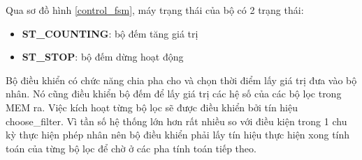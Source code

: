 Qua sơ đồ hình \ref{control_fsm}, máy trạng thái của bộ có 2 trạng thái:
\begin{itemize}
    \item \textbf{ST\_COUNTING}: bộ đếm tăng giá trị
    \item \textbf{ST\_STOP}: bộ đếm dừng hoạt động
\end{itemize}

Bộ điều khiển có chức năng chia pha cho và chọn thời điểm lấy giá trị đưa vào bộ nhân. Nó cũng điều khiển bộ đếm để lấy giá trị các hệ số của các bộ lọc trong MEM ra. Việc kích hoạt từng bộ lọc sẽ được điều khiển bởi tín hiệu choose\_filter. Vì tần số hệ thống lớn hơn rất nhiều so với điều kiện trong 1 chu kỳ thực hiện phép nhân nên bộ điều khiển phải lấy tín hiệu thực hiện xong tính toán của từng bộ lọc để chờ ở các pha tính toán tiếp theo. 

